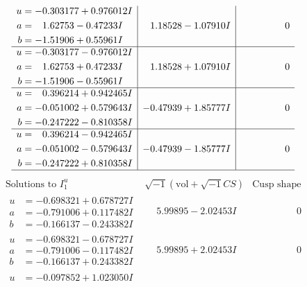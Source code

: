 \documentclass[1p]{elsarticle_modified}
\theoremstyle{definition}
\newcommand{\I}{\sqrt{-1}}
\begin{document}
$$\begin{array}{c|c|c}
\begin{aligned}
u &= -0.303177 + 0.976012 I \\
a &= \phantom{-}1.62753 - 0.47233 I \\
b &= -1.51906 + 0.55961 I\end{aligned}
 & \phantom{-}1.18528 - 1.07910 I & \phantom{-0.000000 } 0 \\ \hline\begin{aligned}
u &= -0.303177 - 0.976012 I \\
a &= \phantom{-}1.62753 + 0.47233 I \\
b &= -1.51906 - 0.55961 I\end{aligned}
 & \phantom{-}1.18528 + 1.07910 I & \phantom{-0.000000 } 0 \\ \hline\begin{aligned}
u &= \phantom{-}0.396214 + 0.942465 I \\
a &= -0.051002 + 0.579643 I \\
b &= -0.247222 - 0.810358 I\end{aligned}
 & -0.47939 + 1.85777 I & \phantom{-0.000000 } 0 \\ \hline\begin{aligned}
u &= \phantom{-}0.396214 - 0.942465 I \\
a &= -0.051002 - 0.579643 I \\
b &= -0.247222 + 0.810358 I\end{aligned}
 & -0.47939 - 1.85777 I & \phantom{-0.000000 } 0\\
 \hline 
 \end{array}$$\newpage$$\begin{array}{c|c|c}  
\text{Solutions to }I^u_{1}& \I (\text{vol} + \sqrt{-1}CS) & \text{Cusp shape}\\
 \hline 
\begin{aligned}
u &= -0.698321 + 0.678727 I \\
a &= -0.791006 + 0.117482 I \\
b &= -0.166137 - 0.243382 I\end{aligned}
 & \phantom{-}5.99895 - 2.02453 I & \phantom{-0.000000 } 0 \\ \hline\begin{aligned}
u &= -0.698321 - 0.678727 I \\
a &= -0.791006 - 0.117482 I \\
b &= -0.166137 + 0.243382 I\end{aligned}
 & \phantom{-}5.99895 + 2.02453 I & \phantom{-0.000000 } 0 \\ \hline\begin{aligned}
u &= -0.097852 + 1.023050 I \\

\end{aligned}
\end{array}$$
\end{document}
